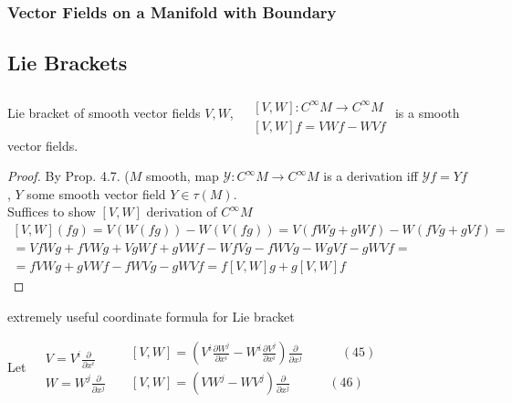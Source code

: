 \subsubsection*{ Vector Fields on a Manifold with Boundary}

\subsection*{ Lie Brackets }

\begin{lemma}[4.12] Lie bracket of smooth vector fields $V,W$, $\begin{aligned} & \quad \\
    & [V, W ] : C^{\infty} M \to C^{\infty} M \\ 
    & [V, W ] f = VW f - WV f \end{aligned}$ \quad is a smooth vector fields.  
\end{lemma}

\begin{proof}
  By Prop. 4.7.  ($M$ smooth, map $\mathcal{Y} : C^{\infty}M \to C^{\infty} M$ is a derivation iff $\mathcal{Y} f = Yf$, $Y$ some smooth vector field $Y \in \tau(M)$.  \\
Suffices to show $[V,W]$ derivation of $C^{\infty}M$  
\[
\begin{gathered}
  [V,W] (fg) = V(W(fg)) -  W(V(fg)) = V(fWg + gWf) - W( fVg  + gVf) = \\
   = VfWg + fVW g + Vg Wf + gVWf - WfVg - fWVg - WgVf - gWVf  = \\
   =fVWg + gVWf - fWV g - gWVf = f[V,W] g + g[V,W]f
\end{gathered}
\]
\end{proof}


extremely useful coordinate formula for Lie bracket 
\begin{lemma}[4.13]
  Let $\begin{aligned} & \quad \\
    & V = V^i \frac{ \partial }{ \partial x^i} \\ 
    & W = W^j \frac{ \partial }{ \partial x^j} \end{aligned}$ \quad \quad $\begin{aligned}
    & [V,W] = \left( V^i \frac{ \partial W^j}{ \partial x^i } - W^i \frac{ \partial V^j}{ \partial x^i } \right) \frac{ \partial }{ \partial x^j } \quad \quad \quad (45) \\ 
    & [V,W]  = (VW^j - WV^j) \frac{\partial }{ \partial x^j} \quad \quad \quad (46) \end{aligned}$

\end{lemma}

